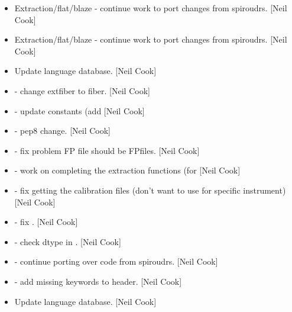 \documentclass[a4paper,10pt,english]{report}
\begin{document}
\label{\detokenize{misc/changelog:id104}}\begin{itemize}
\item {} 
Extraction/flat/blaze - continue work to port changes from spiroudrs.
{[}Neil Cook{]}

\item {} 
Extraction/flat/blaze - continue work to port changes from spiroudrs.
{[}Neil Cook{]}

\item {} 
Update language database. {[}Neil Cook{]}

\item {} 
 - change \textendash{}extfiber to \textendash{}fiber. {[}Neil Cook{]}

\item {} 
 - update constants (add  {[}Neil Cook{]}

\item {} 
 - pep8 change. {[}Neil Cook{]}

\item {} 
 - fix problem FP file should be FPfiles.
{[}Neil Cook{]}

\item {} 
 - work on completing the extraction functions (for
 {[}Neil Cook{]}

\item {} 
 - fix getting the calibration files (don’t want
to use  for specific instrument) {[}Neil Cook{]}

\item {} 
 - fix . {[}Neil Cook{]}

\item {} 
 - check dtype in . {[}Neil
Cook{]}

\item {} 
 - continue porting over code from spiroudrs. {[}Neil
Cook{]}

\item {} 
 - add missing keywords to header. {[}Neil Cook{]}

\item {} 
Update language database. {[}Neil Cook{]}


\end{itemize}
\end{document}
